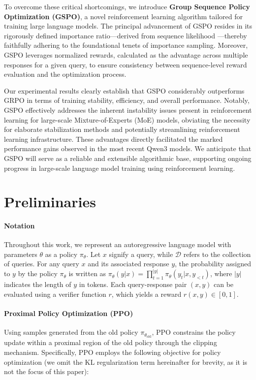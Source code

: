 To overcome these critical shortcomings, we introduce \textbf{Group Sequence Policy Optimization (GSPO)}, a novel reinforcement learning algorithm tailored for training large language models. The principal advancement of GSPO resides in its rigorously defined importance ratio—derived from sequence likelihood \citep{click}—thereby faithfully adhering to the foundational tenets of importance sampling. Moreover, GSPO leverages normalized rewards, calculated as the advantage across multiple responses for a given query, to ensure consistency between sequence-level reward evaluation and the optimization process.

Our experimental results clearly establish that GSPO considerably outperforms GRPO in terms of training stability, efficiency, and overall performance. Notably, GSPO effectively addresses the inherent instability issues present in reinforcement learning for large-scale Mixture-of-Experts (MoE) models, obviating the necessity for elaborate stabilization methods and potentially streamlining reinforcement learning infrastructure. These advantages directly facilitated the marked performance gains observed in the most recent Qwen3 models. We anticipate that GSPO will serve as a reliable and extensible algorithmic base, supporting ongoing progress in large-scale language model training using reinforcement learning.

\section{Preliminaries}

\paragraph{Notation}
Throughout this work, we represent an autoregressive language model with parameters $\theta$ as a policy $\pi_\theta$.
Let $x$ signify a query, while $\mathcal{D}$ refers to the collection of queries. For any query $x$ and its associated response $y$, the probability assigned to $y$ by the policy $\pi_\theta$ is written as $\pi_\theta (y | x)=\prod_{t=1}^{|y|} \pi_\theta (y_t | x, y_{<t} )$, where $|y|$ indicates the length of $y$ in tokens. Each query-response pair $(x, y)$ can be evaluated using a verifier function $r$, which yields a reward $r(x, y) \in [0, 1]$.

\paragraph{Proximal Policy Optimization (PPO)} Using samples generated from the old policy $\pi_{\theta_\text{old}}$, PPO \citep{ppo} constrains the policy update within a proximal region of the old policy through the clipping mechanism. Specifically, PPO employs the following objective for policy optimization (we omit the KL regularization term hereinafter for brevity, as it is not the focus of this paper):

